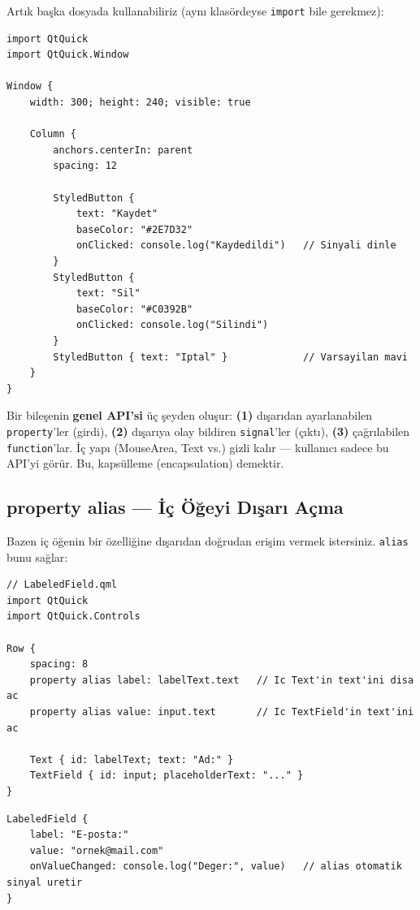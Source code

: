 \documentclass[11pt,a4paper]{article}
\newcommand{\kod}[1]{\texttt{\color{koyuGri}#1}}
\begin{document}
Artık başka dosyada kullanabiliriz (aynı klasördeyse \kod{import} bile gerekmez):

\begin{lstlisting}
import QtQuick
import QtQuick.Window

Window {
    width: 300; height: 240; visible: true

    Column {
        anchors.centerIn: parent
        spacing: 12

        StyledButton {
            text: "Kaydet"
            baseColor: "#2E7D32"
            onClicked: console.log("Kaydedildi")   // Sinyali dinle
        }
        StyledButton {
            text: "Sil"
            baseColor: "#C0392B"
            onClicked: console.log("Silindi")
        }
        StyledButton { text: "Iptal" }             // Varsayilan mavi
    }
}
\end{lstlisting}

\begin{bilgikutu}
Bir bileşenin \textbf{genel API'si} üç şeyden oluşur: \textbf{(1)} dışarıdan
ayarlanabilen \kod{property}'ler (girdi), \textbf{(2)} dışarıya olay bildiren
\kod{signal}'ler (çıktı), \textbf{(3)} çağrılabilen \kod{function}'lar. İç yapı
(MouseArea, Text vs.) gizli kalır — kullanıcı sadece bu API'yi görür. Bu,
kapsülleme (encapsulation) demektir.
\end{bilgikutu}

\subsection{property alias — İç Öğeyi Dışarı Açma}

Bazen iç öğenin bir özelliğine dışarıdan doğrudan erişim vermek istersiniz.
\kod{alias} bunu sağlar:

\begin{lstlisting}
// LabeledField.qml
import QtQuick
import QtQuick.Controls

Row {
    spacing: 8
    property alias label: labelText.text   // Ic Text'in text'ini disa ac
    property alias value: input.text       // Ic TextField'in text'ini ac

    Text { id: labelText; text: "Ad:" }
    TextField { id: input; placeholderText: "..." }
}
\end{lstlisting}

\begin{lstlisting}
LabeledField {
    label: "E-posta:"
    value: "ornek@mail.com"
    onValueChanged: console.log("Deger:", value)   // alias otomatik sinyal uretir
}
\end{lstlisting}
\end{document}
